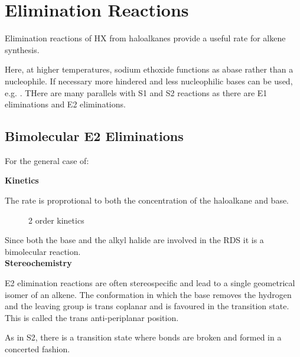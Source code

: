 \section{Elimination Reactions}

Elimination reactions of HX from haloalkanes provide a useful rate for alkene
synthesis.

\begin{figure}[H]
  \centering
\end{figure}

Here, at higher temperatures, sodium ethoxide functions as abase rather than
a nucleophile. If necessary more hindered and less nucleophilic bases can be used,
e.g. . THere are many parallels with S1 and S2
reactions as there are E1 eliminations and E2 eliminations.

\subsection{Bimolecular E2 Eliminations}

For the general case of:

\begin{figure}[H]
  \centering
\end{figure}

\textbf{Kinetics}

The rate is proprotional to both the concentration of the haloalkane and base.

\begin{figure}[H]
  \centering
  \caption*{2 order kinetics}
\end{figure}

Since both the base and the alkyl halide are involved in the RDS it is a bimolecular
reaction.\\

\textbf{Stereochemistry}

E2 elimination reactions are often stereospecific and lead to a single geometrical
isomer of an alkene. The conformation in which the base removes the hydrogen
and the leaving group is trans coplanar and is favoured in the transition state.
This is called the trans anti-periplanar position.

As in S2, there is a transition state where bonds are broken and formed in
a concerted fashion.

